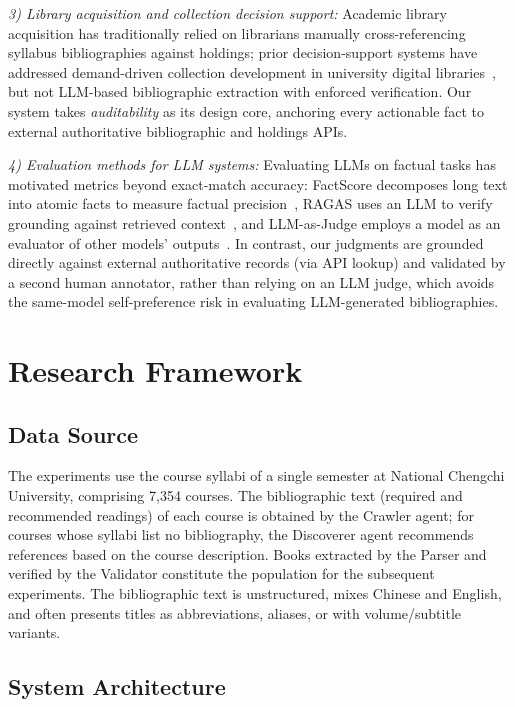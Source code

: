 \documentclass[conference]{IEEEtran}
\begin{document}
\textit{3) Library acquisition and collection decision support:}
Academic library acquisition has traditionally relied on librarians manually
cross-referencing syllabus bibliographies against holdings; prior
decision-support systems have addressed demand-driven collection development in
university digital libraries~\cite{DSS}, but not LLM-based bibliographic
extraction with enforced verification. Our system takes \textit{auditability} as
its design core, anchoring every actionable fact to external authoritative
bibliographic and holdings APIs.

\textit{4) Evaluation methods for LLM systems:}
Evaluating LLMs on factual tasks has motivated metrics beyond exact-match
accuracy: FactScore decomposes long text into atomic facts to measure factual
precision~\cite{FactScore}, RAGAS uses an LLM to verify grounding against
retrieved context~\cite{RAGAS}, and LLM-as-Judge employs a model as an evaluator
of other models' outputs~\cite{LLMJudge}. In contrast, our judgments are grounded
directly against external authoritative records (via API lookup) and validated by
a second human annotator, rather than relying on an LLM judge, which avoids the
same-model self-preference risk in evaluating LLM-generated bibliographies.

\section{Research Framework}

\subsection{Data Source}
The experiments use the course syllabi of a single semester at National
Chengchi University, comprising 7{,}354 courses. The bibliographic text
(required and recommended readings) of each course is obtained by the Crawler
agent; for courses whose syllabi list no bibliography, the Discoverer agent
recommends references based on the course description. Books extracted by the
Parser and verified by the Validator constitute the population for the
subsequent experiments. The bibliographic text is unstructured, mixes Chinese
and English, and often presents titles as abbreviations, aliases, or with
volume/subtitle variants.

\subsection{System Architecture}
\end{document}
